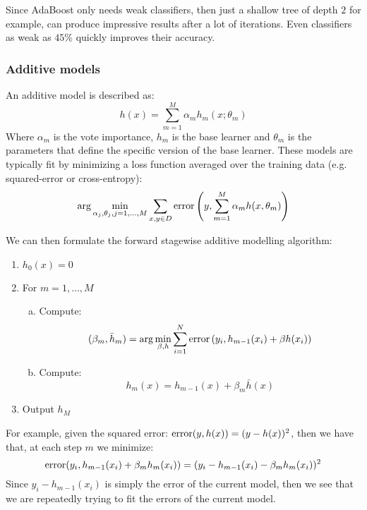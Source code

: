     Since AdaBoost only needs weak classifiers, then just a shallow tree of 
    depth $2$ for example, can produce impressive results after a lot of 
    iterations. Even classifiers as weak as $45\%$ quickly improves their 
    accuracy.
    
    \subsubsection{Additive models}
    An additive model is described as:
    \begin{equation*}
        h(x) = \sum_{m=1}^{M} \alpha_m h_m(x;\theta_m)
    \end{equation*}
    Where $\alpha_m$ is the vote importance, $h_m$ is the base learner and 
    $\theta_m$ is the parameters that define the specific version of the base 
    learner.
    These models are typically fit by minimizing a loss function averaged over 
    the training data (e.g. squared-error or cross-entropy):
    \begin{equation*}
        \arg\min_{\alpha_j,\theta_j,j=1,\dots,M} \sum_{x,y \in D} 
        \text{error}\left(y, \sum_{m=1}^{M}\alpha_m h(x, \theta_m)\right)
    \end{equation*}
    
    We can then formulate the forward stagewise additive modelling algorithm:
    \begin{enumerate}
        \item $h_0(x) = 0$
        \item For $m=1,\dots,M$
        \begin{enumerate}[a)]
            \item Compute:
            \begin{equation*}
                (\beta_m,\bar{h}_m)=\arg\min_{\beta,h}\sum_{i=1}^{N}\text{error}\left(y_i,
                 h_{m-1}(x_i)+\beta h(x_i)\right)
            \end{equation*}
            \item Compute:
            \begin{equation*}
                h_m(x)=h_{m-1}(x)+\beta_m \bar{h}(x)
            \end{equation*}
        \end{enumerate}
        \item Output $h_M$
    \end{enumerate}
    For example, given the squared error: $\text{error}(y, h(x))=(y-h(x))^2$, then we 
    have that, at each step $m$ we minimize:
    \begin{equation*}
        \text{error}(y_i, h_{m-1}(x_i)+\beta_m h_m(x_i))=(y_i-h_{m-1}(x_i)-\beta_m 
        h_m(x_i))^2
    \end{equation*}
    Since $y_i-h_{m-1}(x_i)$ is simply the error of the current model, then we 
    see that we are repeatedly trying to fit the errors of the current model.
    
